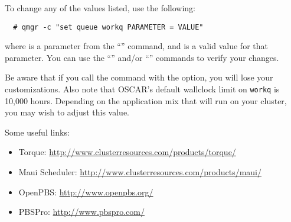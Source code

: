To change any of the values listed, use the following:

\begin{verbatim}
  # qmgr -c "set queue workq PARAMETER = VALUE"
\end{verbatim}

where  is a parameter from the ``''
command, and  is a valid value for that parameter.  You can
use the ``'' and/or ``'' commands to
verify your changes.

Be aware that if you call the  command with the
 option, you will lose your customizations.  Also note
that OSCAR's default wallclock limit on {\tt workq} is 10,000 hours.
Depending on the application mix that will run on your cluster, you
may wish to adjust this value.

Some useful links:

\begin{itemize}
\item Torque: \url{http://www.clusterresources.com/products/torque/}

\item Maui Scheduler: \url{http://www.clusterresources.com/products/maui/}

\item OpenPBS: \url{http://www.openpbs.org/}

\item PBSPro: \url{http://www.pbspro.com/}
\end{itemize}

